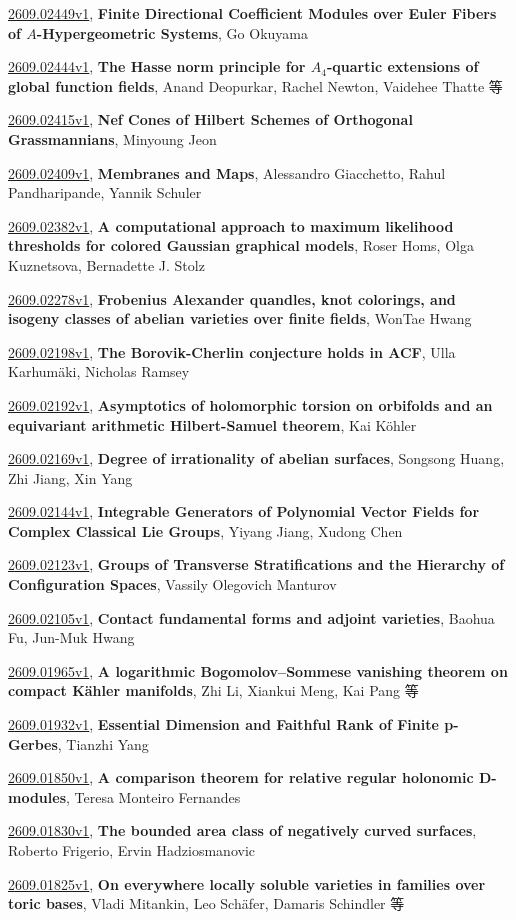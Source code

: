 \documentclass[9pt, a4paper]{article}
\theoremstyle{plain}
\theoremstyle{definition}
\theoremstyle{remark}
\newcommand{\arxiv}[3]{\href{https://arxiv.org/abs/#1}{#1}, \textbf{\textcolor{arxivblue}{#2}}, #3}
\begin{document}
\arxiv{2609.02449v1}{Finite Directional Coefficient Modules over Euler Fibers of $A$-Hypergeometric Systems}{Go Okuyama}

\arxiv{2609.02444v1}{The Hasse norm principle for $A_4$-quartic extensions of global function fields}{Anand Deopurkar, Rachel Newton, Vaidehee Thatte 等}

\arxiv{2609.02415v1}{Nef Cones of Hilbert Schemes of Orthogonal Grassmannians}{Minyoung Jeon}

\arxiv{2609.02409v1}{Membranes and Maps}{Alessandro Giacchetto, Rahul Pandharipande, Yannik Schuler}

\arxiv{2609.02382v1}{A computational approach to maximum likelihood thresholds for colored Gaussian graphical models}{Roser Homs, Olga Kuznetsova, Bernadette J. Stolz}

\arxiv{2609.02278v1}{Frobenius Alexander quandles, knot colorings, and isogeny classes of abelian varieties over finite fields}{WonTae Hwang}

\arxiv{2609.02198v1}{The Borovik-Cherlin conjecture holds in ACF}{Ulla Karhumäki, Nicholas Ramsey}

\arxiv{2609.02192v1}{Asymptotics of holomorphic torsion on orbifolds and an equivariant arithmetic Hilbert-Samuel theorem}{Kai Köhler}

\arxiv{2609.02169v1}{Degree of irrationality of abelian surfaces}{Songsong Huang, Zhi Jiang, Xin Yang}

\arxiv{2609.02144v1}{Integrable Generators of Polynomial Vector Fields for Complex Classical Lie Groups}{Yiyang Jiang, Xudong Chen}

\arxiv{2609.02123v1}{Groups of Transverse Stratifications and the Hierarchy of Configuration Spaces}{Vassily Olegovich Manturov}

\arxiv{2609.02105v1}{Contact fundamental forms and adjoint varieties}{Baohua Fu, Jun-Muk Hwang}

\arxiv{2609.01965v1}{A logarithmic Bogomolov--Sommese vanishing theorem on compact Kähler manifolds}{Zhi Li, Xiankui Meng, Kai Pang 等}

\arxiv{2609.01932v1}{Essential Dimension and Faithful Rank of Finite p-Gerbes}{Tianzhi Yang}

\arxiv{2609.01850v1}{A comparison theorem for relative regular holonomic D-modules}{Teresa Monteiro Fernandes}

\arxiv{2609.01830v1}{The bounded area class of negatively curved surfaces}{Roberto Frigerio, Ervin Hadziosmanovic}

\arxiv{2609.01825v1}{On everywhere locally soluble varieties in families over toric bases}{Vladi Mitankin, Leo Schäfer, Damaris Schindler 等}
\end{document}

